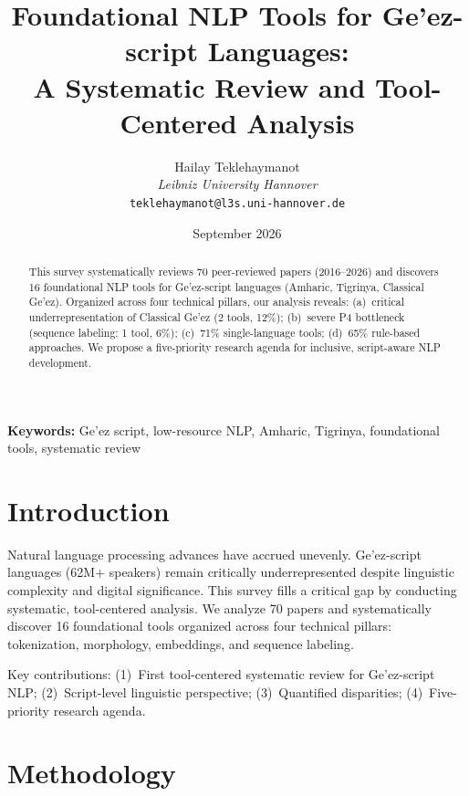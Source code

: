 \documentclass[12pt,a4paper]{article}
\theoremstyle{plain}
\theoremstyle{definition}
\begin{document}
\title{\textbf{Foundational NLP Tools for Ge'ez-script Languages:}\\
\textbf{A Systematic Review and Tool-Centered Analysis}}

\author{Hailay Teklehaymanot\\
\textit{Leibniz University Hannover}\\
\texttt{teklehaymanot@l3s.uni-hannover.de}}

\date{September 2026}

\maketitle

\begin{abstract}
This survey systematically reviews 70 peer-reviewed papers (2016--2026) and discovers 16 foundational NLP tools for Ge'ez-script languages (Amharic, Tigrinya, Classical Ge'ez). Organized across four technical pillars, our analysis reveals: (a)~critical underrepresentation of Classical Ge'ez (2 tools, 12\%); (b)~severe P4 bottleneck (sequence labeling: 1 tool, 6\%); (c)~71\% single-language tools; (d)~65\% rule-based approaches. We propose a five-priority research agenda for inclusive, script-aware NLP development.
\end{abstract}

\noindent\textbf{Keywords:} Ge'ez script, low-resource NLP, Amharic, Tigrinya, foundational tools, systematic review

\tableofcontents
\newpage

\section{Introduction}
Natural language processing advances have accrued unevenly. Ge'ez-script languages (62M+ speakers) remain critically underrepresented despite linguistic complexity and digital significance. This survey fills a critical gap by conducting systematic, tool-centered analysis. We analyze 70 papers and systematically discover 16 foundational tools organized across four technical pillars: tokenization, morphology, embeddings, and sequence labeling.

Key contributions: (1)~First tool-centered systematic review for Ge'ez-script NLP; (2)~Script-level linguistic perspective; (3)~Quantified disparities; (4)~Five-priority research agenda.

\section{Methodology}
\end{document}
